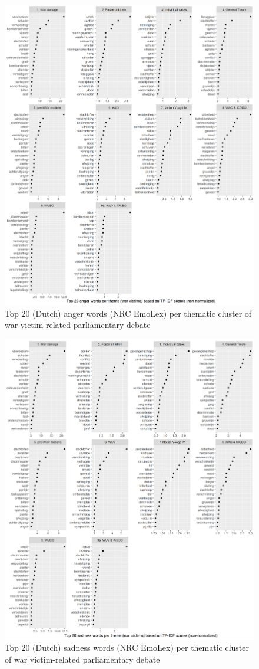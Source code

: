\documentclass{dhbenelux}
\begin{document}
\begin{figure}[h]
\begin{center}
\includegraphics[width=0.8\linewidth]{Images/top201.png}
\end{center}
\caption{Top 20 (Dutch) anger words (NRC EmoLex) per thematic cluster of war victim-related parliamentary debate}
\label{fig:top201}
\end{figure}

\begin{figure}
\begin{center}
\includegraphics[width=0.8\linewidth]{Images/top202.png}
\end{center}
\caption{Top 20 (Dutch) sadness words (NRC EmoLex) per thematic cluster of war victim-related parliamentary debate}
\label{fig:top202}
\end{figure}
\end{document}

